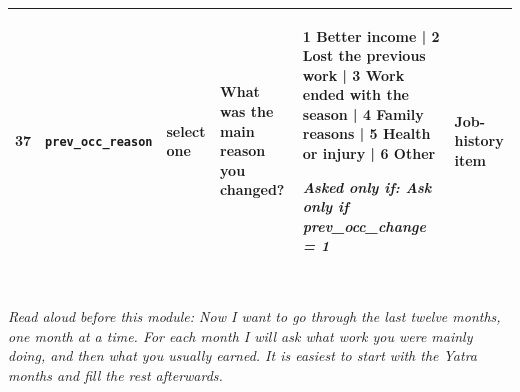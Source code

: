 \documentclass[9pt,a4paper,landscape]{article}
\begin{document}
\begin{longtable}{@{}p{0.5cm}p{3.3cm}p{1.7cm}p{7.3cm}p{5.6cm}p{5.4cm}@{}}
\footnotesize 37 & \footnotesize\texttt{prev\_occ\_reason} & \scriptsize select one & \footnotesize What was the main reason you changed?\par\vspace{1pt}{\footnotesize\color{hdr}{\hifont काम बदलने की मुख्य वजह क्या थी?}} & \scriptsize 1 Better income | 2 Lost the previous work | 3 Work ended with the season | 4 Family reasons | 5 Health or injury | 6 Other\par\vspace{1pt}\textit{Asked only if: Ask only if prev\_occ\_change = 1} & \scriptsize Job-history item\\
\bottomrule\end{longtable}\vspace{6pt}
\\[3pt]
{\small\itshape Read aloud before this module: Now I want to go through the last twelve months, one month at a time. For each month I will ask what work you were mainly doing, and then what you usually earned. It is easiest to start with the Yatra months and fill the rest afterwards.}\\[5pt]
\end{document}
